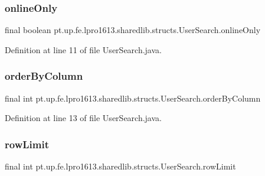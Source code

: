 \subsubsection{\texorpdfstring{online\+Only}{onlineOnly}}
{\footnotesize\ttfamily final boolean pt.\+up.\+fe.\+lpro1613.\+sharedlib.\+structs.\+User\+Search.\+online\+Only}



Definition at line 11 of file User\+Search.\+java.

\hypertarget{classpt_1_1up_1_1fe_1_1lpro1613_1_1sharedlib_1_1structs_1_1_user_search_a09babcb3b1d4613f77423c0564d105d4}{}\label{classpt_1_1up_1_1fe_1_1lpro1613_1_1sharedlib_1_1structs_1_1_user_search_a09babcb3b1d4613f77423c0564d105d4} 
\subsubsection{\texorpdfstring{order\+By\+Column}{orderByColumn}}
{\footnotesize\ttfamily final int pt.\+up.\+fe.\+lpro1613.\+sharedlib.\+structs.\+User\+Search.\+order\+By\+Column}



Definition at line 13 of file User\+Search.\+java.

\hypertarget{classpt_1_1up_1_1fe_1_1lpro1613_1_1sharedlib_1_1structs_1_1_user_search_a8bcfdc0e6dfb51656d1fd6f61ee78295}{}\label{classpt_1_1up_1_1fe_1_1lpro1613_1_1sharedlib_1_1structs_1_1_user_search_a8bcfdc0e6dfb51656d1fd6f61ee78295} 
\subsubsection{\texorpdfstring{row\+Limit}{rowLimit}}
{\footnotesize\ttfamily final int pt.\+up.\+fe.\+lpro1613.\+sharedlib.\+structs.\+User\+Search.\+row\+Limit}



